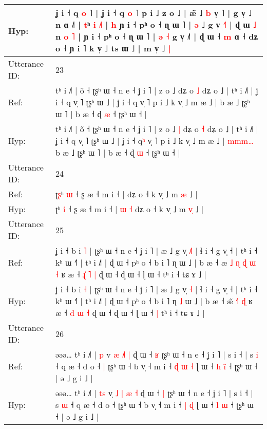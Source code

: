 \documentclass[10pt]{article}
\DeclareRobustCommand{\hl}[1]{{\textcolor{red}{#1}}}
\begin{document}
\begin{longtable}{ll}
 \\
Hyp: & ʝ i ˧ q \hl{}\hl{o} ˥ | ʝ i ˧ q \hl{}\hl{o} ˥ p i ˩ z o ˩ | æ\hl{̃} ˩ \hl{b} v̩ \hl{}˥ | g v̩ ˩ n ɑ ˩\hl{}\hl{}\hl{}\hl{}\hl{}\hl{}˥ | \hl{}\hl{t}ʰ\hl{}\hl{}\hl{}\hl{} \hl{i} \hl{}\hl{˩}˥ |\hl{}\hl{}\hl{}\hl{}\hl{}\hl{} \hl{h} ɲ i ˧ pʰ o ˧ ɳ ɯ ˥ | \hl{ə} ˩ g v̩ \hl{˧}˥ | ɖ ɯ \hl{˩} n \hl{o} \hl{˥} | ɲ i ˧ pʰ o ˧ ɳ ɯ ˥ | \hl{ə} \hl{˧} g v̩ ˩˥ | ɖ ɯ ˧ \hl{m} ɑ ˧ dʑ o ˧ ɲ i ˥ k v̩ ˩ ts ɯ ˩ | m v̩ ˩\hl{ }\hl{|}
 \\
\midrule
Utterance ID: & 23 \\
Ref: & tʰ i ˩˥ | õ ˧ ʈʂʰ ɯ ˧ n e ˧ ʝ i ˥ | z o ˩\hl{}\hl{} dʑ o \hl{˩} dʑ o ˩ | tʰ i ˩˥ | ʝ i ˧ q v̩ ˥ ʈʂʰ ɯ ˩ | ʝ i ˧ q\hl{} v̩ ˥ p i ˩ k v̩ ˩ m æ ˩ |\hl{}\hl{}\hl{}\hl{}\hl{} b æ ˩ ʈʂʰ ɯ ˥ | b æ ˧ ɖ \hl{æ} ˧ ʈʂʰ ɯ ˧ |
 \\
Hyp: & tʰ i ˩˥ | õ ˧ ʈʂʰ ɯ ˧ n e ˧ ʝ i ˥ | z o ˩\hl{ }\hl{|} dʑ o \hl{˧} dʑ o ˩ | tʰ i ˩˥ | ʝ i ˧ q v̩ ˥ ʈʂʰ ɯ ˩ | ʝ i ˧ q\hl{ʰ} v̩ ˥ p i ˩ k v̩ ˩ m æ ˩ |\hl{ }\hl{m}\hl{m}\hl{m}\hl{…} b æ ˩ ʈʂʰ ɯ ˥ | b æ ˧ ɖ \hl{ɯ} ˧ ʈʂʰ ɯ ˧ |
 \\
\midrule
Utterance ID: & 24 \\
Ref: & ʈ\hl{ʂ}ʰ \hl{ɯ} ˧ ʂ æ ˧ m i ˧ |\hl{}\hl{}\hl{}\hl{} dʑ o ˧ k v̩ ˩ m \hl{}\hl{æ} ˩ |
 \\
Hyp: & ʈ\hl{}ʰ \hl{i} ˧ ʂ æ ˧ m i ˧ |\hl{ }\hl{ɯ}\hl{ }\hl{˧} dʑ o ˧ k v̩ ˩ m \hl{v}\hl{̩} ˩ |
 \\
\midrule
Utterance ID: & 25 \\
Ref: & ʝ i ˧ b i \hl{˥} | ʈʂʰ ɯ ˧ n e ˧ ʝ i ˥ | æ ˩ g v̩ \hl{˩}\hl{˥} | ɬ i ˧ g v̩ ˧ | tʰ i ˧ kʰ ɯ ˧˥ | tʰ i ˩˥ | ɖ ɯ ˧ pʰ o ˧ b i ˥ ɳ\hl{}\hl{} ɯ ˩ | b æ ˧ æ\hl{ }\hl{˩}\hl{ }\hl{ɳ} \hl{ɖ}\hl{ }\hl{ɯ} \hl{˧} ʁ æ ˧ \hl{ɻ}\hl{̍} \hl{˥} \hl{|} ɖ ɯ ˧ ɖ ɯ ˧ ɭ ɯ ˧\hl{}\hl{} tʰ i ˧ tɕ ɤ ˩ |
 \\
Hyp: & ʝ i ˧ b i \hl{˧} | ʈʂʰ ɯ ˧ n e ˧ ʝ i ˥ | æ ˩ g v̩ \hl{}\hl{˧} | ɬ i ˧ g v̩ ˧ | tʰ i ˧ kʰ ɯ ˧˥ | tʰ i ˩˥ | ɖ ɯ ˧ pʰ o ˧ b i ˥ ɳ\hl{ }\hl{˩} ɯ ˩ | b æ ˧ æ\hl{}\hl{}\hl{}\hl{̃} \hl{}\hl{˧}\hl{˥} \hl{ɖ} ʁ æ ˧ \hl{}\hl{d} \hl{ɯ} \hl{˧} ɖ ɯ ˧ ɖ ɯ ˧ ɭ ɯ ˧\hl{ }\hl{|} tʰ i ˧ tɕ ɤ ˩ |
 \\
\midrule
Utterance ID: & 26 \\
Ref: & əəə… tʰ i ˩˥ | \hl{}\hl{p} v\hl{} \hl{æ} \hl{}\hl{˩}\hl{˥} \hl{|} ɖ ɯ ˧ \hl{ʁ} ʈʂʰ ɯ ˧ n e ˧ ʝ i ˥ | s i ˧ | s \hl{i} ˧ q æ ˧ d o ˧\hl{ }\hl{|} ʈʂʰ ɯ ˧ b v̩ ˧ m i ˧\hl{ }\hl{ɖ} \hl{ɯ} \hl{˧} ɭ ɯ ˧ \hl{h} \hl{i}\hl{̃} ˧ ʈʂʰ ɯ ˧ | ə ˩ g i ˩ |
 \\
Hyp: & əəə… tʰ i ˩˥ | \hl{t}\hl{s} v\hl{̩} \hl{˩} \hl{|}\hl{ }\hl{æ} \hl{˧} ɖ ɯ ˧ \hl{|} ʈʂʰ ɯ ˧ n e ˧ ʝ i ˥ | s i ˧ | s \hl{ɯ} ˧ q æ ˧ d o ˧\hl{}\hl{} ʈʂʰ ɯ ˧ b v̩ ˧ m i ˧\hl{}\hl{} \hl{|} \hl{ɖ} ɭ ɯ ˧ \hl{l} \hl{}\hl{ɯ} ˧ ʈʂʰ ɯ ˧ | ə ˩ g i ˩ |

\end{longtable}
\end{document}
